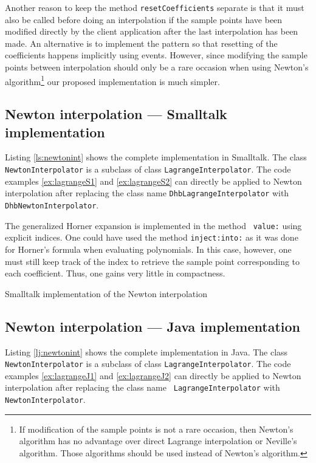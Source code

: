 \documentclass[twoside]{book}
\begin{document}
Another reason to keep the method {\tt resetCoefficients} separate
is that it must also be called before doing an interpolation if
the sample points have been modified directly by the client
application after the last interpolation has been made. An
alternative is to implement the 
pattern so that resetting of the coefficients happens implicitly
using events. However, since modifying the sample points between
interpolation should only be a rare occasion when using Newton's
algorithm\footnote{If modification of the sample points is not a
rare occasion, then Newton's algorithm has no advantage over
direct Lagrange interpolation or Neville's algorithm. Those
algorithms should be used instead of Newton's algorithm.} our
proposed implementation is much simpler.

\subsection{Newton interpolation --- Smalltalk implementation}
Listing \ref{ls:newtonint} shows the complete implementation in
Smalltalk. The class {\tt NewtonInterpolator} is a subclass of
class {\tt LagrangeInterpolator}. The code examples
\ref{ex:lagrangeS1} and \ref{ex:lagrangeS2} can directly be
applied to Newton interpolation after replacing the class name
{\tt DhbLagrangeInterpolator} with {\tt DhbNewtonInterpolator}.

The generalized Horner expansion is implemented in the method {\tt
value:} using explicit indices. One could have used the method
{\tt inject:into:} as it was done for Horner's formula when
evaluating polynomials. In this case, however, one must still keep
track of the index to retrieve the sample point corresponding to
each coefficient. Thus, one gains very little in compactness.


\begin{listing}
  Smalltalk implementation of the Newton interpolation
\label{ls:newtonint}

\end{listing}

\subsection{Newton interpolation --- Java implementation}
Listing \ref{lj:newtonint} shows the complete implementation in
Java. The class {\tt NewtonInterpolator} is a subclass of class
{\tt LagrangeInterpolator}. The code examples \ref{ex:lagrangeJ1}
and \ref{ex:lagrangeJ2} can directly be applied to Newton
interpolation after replacing the class name {\tt
LagrangeInterpolator} with {\tt NewtonInterpolator}.
\end{document}
